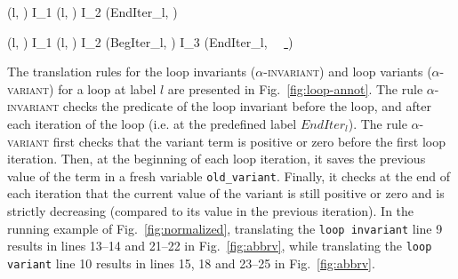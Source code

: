 \begin{figure*}[tb]
  \scriptsize{
 {
    {
      (l, ) 
      I_1 \concat (l, )
      \concat I_2 \concat (EndIter_l, )
    }
  }
 \vspace{-1mm}

  {
    {
      \splitfrac
          {
            (l, ) 
          }
          {
            I_1 \concat (l,
            \underline{ \Zclear}
            \mathtt{);})
            \concat I_2
            \concat (BegIter_l,
            \underline{\Zinit {} \Zclear}
            \semicolon
            )
            \concat I_3
            \concat(EndIter_l,
            \underline{}\
            \mathtt{ \&\& }\
            \underline{\Zclear{} \Zclear}
            \mathtt{);})
          }
    }
  }
  }
  \vspace{-4mm}
  \caption{Transformation rules for loop annotations: invariant and variant}
  \label{fig:loop-annot}
\vspace{-3mm}
\end{figure*}


The translation rules for the loop invariants (\textsc{$\alpha$-invariant}) and
loop variants (\textsc{$\alpha$-variant}) for a loop at label $l$ are presented in
Fig.~\ref{fig:loop-annot}. The rule \textsc{$\alpha$-invariant} checks the
predicate of the loop invariant before the loop, and after
each iteration of the loop (i.e. at the predefined label $EndIter_l$). The rule
\textsc{$\alpha$-variant} first checks that the variant term is positive or zero
before the first loop iteration. Then, at the beginning of each loop iteration,
it saves the previous value of the term in a fresh variable 
\lstinline|old_variant|. Finally, it checks at the end of each iteration that
the current value of the variant is still positive or zero and is strictly
decreasing (compared to its value in the previous iteration).
In the running example of Fig.~\ref{fig:normalized}, translating the
\lstinline|loop invariant| line 9 results in lines 13--14 and 21--22 in
Fig.~\ref{fig:abbrv}, while translating the \lstinline|loop variant| line 10
results in lines 15, 18 and 23--25 in Fig.~\ref{fig:abbrv}.


